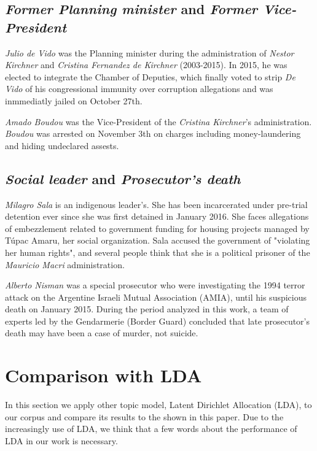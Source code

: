 \documentclass{bmcart}
\begin{document}
\begin{backmatter}
\subsection*{\emph{Former Planning minister} and \emph{Former Vice-President}}

\par \emph{Julio de Vido} was the Planning minister during the administration of \emph{Nestor Kirchner} and \emph{Cristina Fernandez de Kirchner} (2003-2015). In 2015, he was elected to integrate the Chamber of Deputies, which finally voted to strip \emph{De Vido} of his congressional immunity over corruption allegations and was inmmediatly jailed on October 27th.

\par \emph{Amado Boudou} was the Vice-President of the \emph{Cristina Kirchner}'s administration.
\emph{Boudou} was arrested on November 3th on charges including money-laundering and hiding undeclared assests.

\subsection*{\emph{Social leader} and \emph{Prosecutor's death}}

\par \emph{Milagro Sala} is an indigenous leader’s. 
She has been incarcerated under pre-trial detention ever since she was first detained in January 2016. She faces allegations of embezzlement related to government funding for housing projects managed by Túpac Amaru, her social organization.
Sala accused the government of "violating her human rights", and several people think that she is a political prisoner of the \emph{Mauricio Macri} administration.

\par \emph{Alberto Nisman} was a special prosecutor who were investigating the 1994 terror attack on the Argentine Israeli Mutual Association (AMIA), until his suspicious death on January 2015.
During the period analyzed in this work, a team of experts led by the Gendarmerie (Border Guard) concluded that late prosecutor's death may have been a case of murder, not suicide.

\section*{Comparison with LDA}

\par In this section we apply other topic model, Latent Dirichlet Allocation \cite{blei2003latent} (LDA), to our corpus and compare its results to the shown in this paper. Due to the increasingly use of LDA, we think that a few words about the performance of LDA in our work is necessary. 


\end{backmatter}
\end{document}

